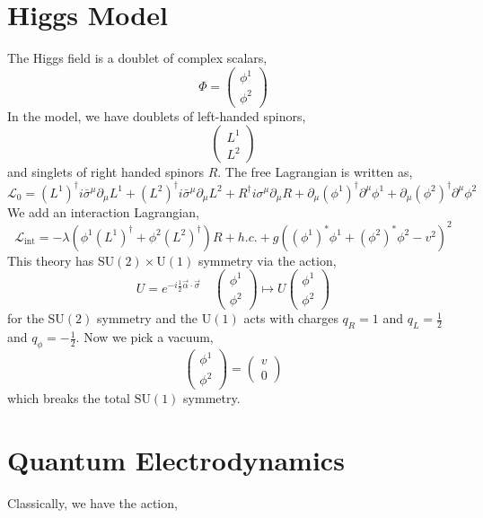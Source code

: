 \documentclass[12pt]{extarticle}
\newcommand{\lagrange}{\mathcal{L}}
\newcommand{\ipic}{\mathrm{int}}
\theoremstyle{definition}
\begin{document}
\section{Higgs Model}

The Higgs field is a doublet of complex scalars,
\[ \Phi = \begin{pmatrix}
\phi^1 \\
\phi^2 
\end{pmatrix}\]
In the model, we have doublets of left-handed spinors,
\[ \begin{pmatrix}
L^1 \\
L^2
\end{pmatrix}\]
and singlets of right handed spinors $R$. The free Lagrangian is written as,
\[ \lagrange_0 = (L^1)^\dagger i \bar{\sigma}^\mu \partial_\mu L^1 + (L^2)^\dagger i \bar{\sigma}^\mu \partial_\mu L^2 + R^\dagger i \sigma^\mu \partial_\mu R + \partial_\mu (\phi^1)^\dagger \partial^\mu \phi^1 + \partial_\mu (\phi^2)^\dagger \partial^\mu \phi^2 \]
We add an interaction Lagrangian,
\[ \lagrange_{\ipic} = - \lambda \left( \phi^1 (L^1)^\dagger + \phi^2 (L^2)^\dagger \right) R + h.c. + g \left( (\phi^1)^* \phi^1 + (\phi^2)^* \phi^2 - v^2 \right)^2 \]
This theory has $\mathrm{SU}(2) \times \mathrm{U}(1)$ symmetry via the action,
\[ U = e^{-i \frac{1}{2} \vec{\alpha} \cdot \vec{\sigma}} \quad 
\begin{pmatrix}
\phi^1 \\
\phi^2 
\end{pmatrix}
\mapsto U
\begin{pmatrix}
\phi^1 \\
\phi^2 
\end{pmatrix} \]
for the $\mathrm{SU}(2)$ symmetry and the $\mathrm{U}(1)$ acts with charges $q_R = 1$ and $q_L = \frac{1}{2}$ and $q_{\phi} = -\frac{1}{2}$.
Now we pick a vacuum,
\[ 
\begin{pmatrix}
\phi^1 \\
\phi^2 
\end{pmatrix}
=
\begin{pmatrix}
v \\
0 
\end{pmatrix}\]
which breaks the total $\mathrm{SU}(1)$ symmetry. 

\section{Quantum Electrodynamics}

Classically, we have the action,
\end{document}
